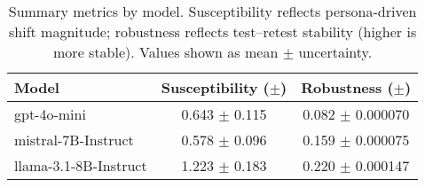\begin{table}[t]
  \centering
  \caption{Summary metrics by model. Susceptibility reflects persona-driven shift magnitude; robustness reflects test--retest stability (higher is more stable). Values shown as mean $\pm$ uncertainty.}
  \label{tab:summary_metrics}
  \begin{tabular}{lcc}
    \toprule
    Model & Susceptibility ($\pm$) & Robustness ($\pm$) \\
    \midrule
    gpt-4o-mini & 0.643 $\pm$ 0.115 & 0.082 $\pm$ 0.000070 \\
    mistral-7B-Instruct & 0.578 $\pm$ 0.096 & 0.159 $\pm$ 0.000075 \\
    llama-3.1-8B-Instruct & 1.223 $\pm$ 0.183 & 0.220 $\pm$ 0.000147 \\
    \bottomrule
  \end{tabular}
\end{table}

